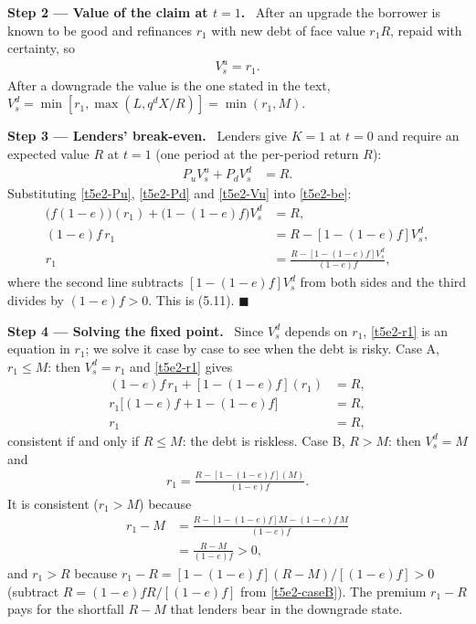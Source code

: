 \documentclass[11pt,a4paper]{article}
\newcommand{\step}[2]{\par\medskip\noindent\textbf{Step #1 --- #2.}~}
\begin{document}
\step{2}{Value of the claim at $t=1$} After an upgrade the borrower is known to be good and
refinances $r_1$ with new debt of face value $r_1R$, repaid with certainty, so
\begin{align}
  V_s^u = r_1. \label{t5e2-Vu}
\end{align}
After a downgrade the value is the one stated in the text, $V_s^d=\min[r_1,\max(L,q^dX/R)]=\min(r_1,M)$.

\step{3}{Lenders' break-even} Lenders give $K=1$ at $t=0$ and require an expected value $R$ at
$t=1$ (one period at the per-period return $R$):
\begin{align}
  P_uV_s^u+P_dV_s^d &= R. \label{t5e2-be}
\end{align}
Substituting \eqref{t5e2-Pu}, \eqref{t5e2-Pd} and \eqref{t5e2-Vu} into \eqref{t5e2-be}:
\begin{align}
  \bigl(f(1-e)\bigr)(r_1)+\bigl(1-(1-e)f\bigr)V_s^d &= R, \nonumber\\
  (1-e)f\,r_1 &= R-[1-(1-e)f]V_s^d, \nonumber\\
  r_1 &= \frac{R-[1-(1-e)f]V_s^d}{(1-e)f}, \label{t5e2-r1}
\end{align}
where the second line subtracts $[1-(1-e)f]V_s^d$ from both sides and the third divides by
$(1-e)f>0$. This is (5.11). $\blacksquare$

\step{4}{Solving the fixed point} Since $V_s^d$ depends on $r_1$, \eqref{t5e2-r1} is an equation in
$r_1$; we solve it case by case to see when the debt is risky. Case A, $r_1\leq M$: then $V_s^d=r_1$ and
\eqref{t5e2-r1} gives
\begin{align}
  (1-e)f\,r_1+[1-(1-e)f](r_1) &= R, \nonumber\\
  r_1\bigl[(1-e)f+1-(1-e)f\bigr] &= R, \nonumber\\
  r_1 &= R, \label{t5e2-caseA}
\end{align}
consistent if and only if $R\leq M$: the debt is riskless. Case B, $R>M$: then $V_s^d=M$ and
\begin{align}
  r_1 = \frac{R-[1-(1-e)f](M)}{(1-e)f}. \label{t5e2-caseB}
\end{align}
It is consistent ($r_1>M$) because
\begin{align}
  r_1-M &= \frac{R-[1-(1-e)f]M-(1-e)f\,M}{(1-e)f} \nonumber\\
        &= \frac{R-M}{(1-e)f}>0, \nonumber
\end{align}
and $r_1>R$ because $r_1-R=[1-(1-e)f](R-M)/[(1-e)f]>0$ (subtract $R=(1-e)fR/[(1-e)f]$ from
\eqref{t5e2-caseB}). The premium $r_1-R$ pays for the shortfall $R-M$ that lenders bear in the
downgrade state.
\end{document}
